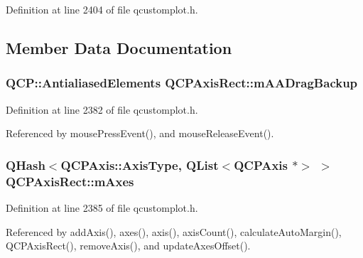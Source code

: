 Definition at line 2404 of file qcustomplot.\+h.



\subsection{Member Data Documentation}
\hypertarget{class_q_c_p_axis_rect_aa4a24f76360cfebe1bcf17a77fa7521b}{}
\subsubsection[{m\+A\+A\+Drag\+Backup}]{\setlength{\rightskip}{0pt plus 5cm}Q\+C\+P\+::\+Antialiased\+Elements Q\+C\+P\+Axis\+Rect\+::m\+A\+A\+Drag\+Backup\hspace{0.3cm}{\ttfamily [protected]}}\label{class_q_c_p_axis_rect_aa4a24f76360cfebe1bcf17a77fa7521b}


Definition at line 2382 of file qcustomplot.\+h.



Referenced by mouse\+Press\+Event(), and mouse\+Release\+Event().

\hypertarget{class_q_c_p_axis_rect_ac2cb3ba9a25b733883afc3bd25f7d82b}{}
\subsubsection[{m\+Axes}]{\setlength{\rightskip}{0pt plus 5cm}Q\+Hash$<${\bf Q\+C\+P\+Axis\+::\+Axis\+Type}, Q\+List$<${\bf Q\+C\+P\+Axis} $\ast$$>$ $>$ Q\+C\+P\+Axis\+Rect\+::m\+Axes\hspace{0.3cm}{\ttfamily [protected]}}\label{class_q_c_p_axis_rect_ac2cb3ba9a25b733883afc3bd25f7d82b}


Definition at line 2385 of file qcustomplot.\+h.



Referenced by add\+Axis(), axes(), axis(), axis\+Count(), calculate\+Auto\+Margin(), Q\+C\+P\+Axis\+Rect(), remove\+Axis(), and update\+Axes\+Offset().

\hypertarget{class_q_c_p_axis_rect_a5748e1a37f63c428e38b0a7724b46259}{}
